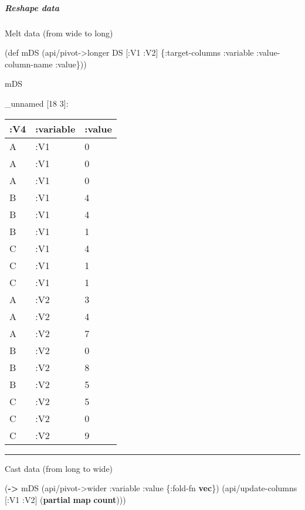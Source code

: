 \documentclass[]{article}
\newenvironment{Shaded}{\begin{snugshade}}{\end{snugshade}}
\newcommand{\KeywordTok}[1]{\textcolor[rgb]{0.13,0.29,0.53}{\textbf{#1}}}
\newcommand{\FunctionTok}[1]{\textcolor[rgb]{0.00,0.00,0.00}{#1}}
\newcommand{\BuiltInTok}[1]{#1}
\newcommand{\AttributeTok}[1]{\textcolor[rgb]{0.77,0.63,0.00}{#1}}
\newcommand{\NormalTok}[1]{#1}
\let\oldsubparagraph\subparagraph
\renewcommand{\subparagraph}[1]{\oldsubparagraph{#1}\mbox{}}
\begin{document}
\subparagraph{Reshape data}\label{reshape-data}

Melt data (from wide to long)

\begin{Shaded}
\begin{Highlighting}[]
\NormalTok{(}\BuiltInTok{def}\FunctionTok{ mDS }\NormalTok{(api/pivot->longer DS [}\AttributeTok{:V1} \AttributeTok{:V2}\NormalTok{] \{}\AttributeTok{:target-columns} \AttributeTok{:variable}
                                          \AttributeTok{:value-column-name} \AttributeTok{:value}\NormalTok{\}))}
\end{Highlighting}
\end{Shaded}

\begin{Shaded}
\begin{Highlighting}[]
\NormalTok{mDS}
\end{Highlighting}
\end{Shaded}

\_unnamed {[}18 3{]}:

\begin{longtable}[]{@{}lll@{}}
\toprule
:V4 & :variable & :value\tabularnewline
\midrule
\endhead
A & :V1 & 0\tabularnewline
A & :V1 & 0\tabularnewline
A & :V1 & 0\tabularnewline
B & :V1 & 4\tabularnewline
B & :V1 & 4\tabularnewline
B & :V1 & 1\tabularnewline
C & :V1 & 4\tabularnewline
C & :V1 & 1\tabularnewline
C & :V1 & 1\tabularnewline
A & :V2 & 3\tabularnewline
A & :V2 & 4\tabularnewline
A & :V2 & 7\tabularnewline
B & :V2 & 0\tabularnewline
B & :V2 & 8\tabularnewline
B & :V2 & 5\tabularnewline
C & :V2 & 5\tabularnewline
C & :V2 & 0\tabularnewline
C & :V2 & 9\tabularnewline
\bottomrule
\end{longtable}

\begin{center}\rule{0.5\linewidth}{0.5pt}\end{center}

Cast data (from long to wide)

\begin{Shaded}
\begin{Highlighting}[]
\NormalTok{(}\KeywordTok{->}\NormalTok{ mDS}
\NormalTok{    (api/pivot->wider }\AttributeTok{:variable} \AttributeTok{:value}\NormalTok{ \{}\AttributeTok{:fold-fn} \KeywordTok{vec}\NormalTok{\})}
\NormalTok{    (api/update-columns [}\AttributeTok{:V1} \AttributeTok{:V2}\NormalTok{] (}\KeywordTok{partial} \KeywordTok{map} \KeywordTok{count}\NormalTok{)))}
\end{Highlighting}
\end{Shaded}
\end{document}
